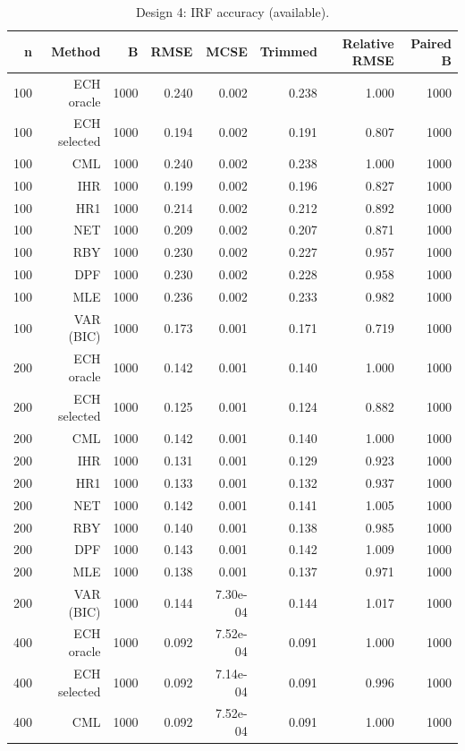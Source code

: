 \begin{table}[p]\centering
\caption{Design 4: IRF accuracy (available).}
\small
\begin{tabular}{rrrrrrrr}\toprule
n & Method & B & RMSE & MCSE & Trimmed & Relative RMSE & Paired B \\\midrule
100 & ECH oracle & 1000 & 0.240 & 0.002 & 0.238 & 1.000 & 1000 \\
100 & ECH selected & 1000 & 0.194 & 0.002 & 0.191 & 0.807 & 1000 \\
100 & CML & 1000 & 0.240 & 0.002 & 0.238 & 1.000 & 1000 \\
100 & IHR & 1000 & 0.199 & 0.002 & 0.196 & 0.827 & 1000 \\
100 & HR1 & 1000 & 0.214 & 0.002 & 0.212 & 0.892 & 1000 \\
100 & NET & 1000 & 0.209 & 0.002 & 0.207 & 0.871 & 1000 \\
100 & RBY & 1000 & 0.230 & 0.002 & 0.227 & 0.957 & 1000 \\
100 & DPF & 1000 & 0.230 & 0.002 & 0.228 & 0.958 & 1000 \\
100 & MLE & 1000 & 0.236 & 0.002 & 0.233 & 0.982 & 1000 \\
100 & VAR (BIC) & 1000 & 0.173 & 0.001 & 0.171 & 0.719 & 1000 \\
200 & ECH oracle & 1000 & 0.142 & 0.001 & 0.140 & 1.000 & 1000 \\
200 & ECH selected & 1000 & 0.125 & 0.001 & 0.124 & 0.882 & 1000 \\
200 & CML & 1000 & 0.142 & 0.001 & 0.140 & 1.000 & 1000 \\
200 & IHR & 1000 & 0.131 & 0.001 & 0.129 & 0.923 & 1000 \\
200 & HR1 & 1000 & 0.133 & 0.001 & 0.132 & 0.937 & 1000 \\
200 & NET & 1000 & 0.142 & 0.001 & 0.141 & 1.005 & 1000 \\
200 & RBY & 1000 & 0.140 & 0.001 & 0.138 & 0.985 & 1000 \\
200 & DPF & 1000 & 0.143 & 0.001 & 0.142 & 1.009 & 1000 \\
200 & MLE & 1000 & 0.138 & 0.001 & 0.137 & 0.971 & 1000 \\
200 & VAR (BIC) & 1000 & 0.144 & 7.30e-04 & 0.144 & 1.017 & 1000 \\
400 & ECH oracle & 1000 & 0.092 & 7.52e-04 & 0.091 & 1.000 & 1000 \\
400 & ECH selected & 1000 & 0.092 & 7.14e-04 & 0.091 & 0.996 & 1000 \\
400 & CML & 1000 & 0.092 & 7.52e-04 & 0.091 & 1.000 & 1000 \\

\end{tabular}
\end{table}
